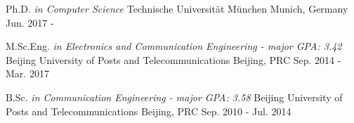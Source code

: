 



\begin{cventries}

\cventry
{Ph.D. \it{in Computer Science}} %
{Technische Universität München} %
{Munich, Germany} %
{Jun. 2017 - } %
{ %
}


\cventry
{M.Sc.Eng. \it{in Electronics and Communication Engineering} - major GPA: 3.42} %
{Beijing University of Posts and Telecommunications} %
{Beijing, PRC} %
{Sep. 2014 - Mar. 2017} %
{ %
}


\cventry
{B.Sc. \it{in Communication Engineering} - major GPA: 3.58} %
{Beijing University of Posts and Telecommunications} %
{Beijing, PRC} %
{Sep. 2010 - Jul. 2014} %
{ %
}%

\end{cventries}

